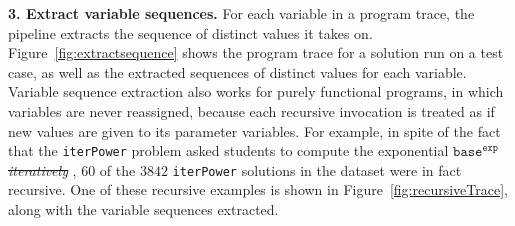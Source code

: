 \documentclass[12pt,twoside]{mitthesis}
\newcommand \codevar[1]{\texttt{#1}}
\providecommand{\DIFaddtex}[1]{{\protect\color{blue}\uwave{#1}}} %
\providecommand{\DIFdeltex}[1]{{\protect\color{red}\sout{#1}}}                      %
\providecommand{\DIFaddbegin}{} %
\providecommand{\DIFaddend}{} %
\providecommand{\DIFdelbegin}{} %
\providecommand{\DIFdelend}{} %
\providecommand{\DIFadd}[1]{\texorpdfstring{\DIFaddtex{#1}}{#1}} %
\providecommand{\DIFdel}[1]{\texorpdfstring{\DIFdeltex{#1}}{}} %
\begin{document}
{\bf 3. Extract variable sequences.} For each variable in a program trace, the pipeline extracts the sequence of distinct values it takes on. Figure~\ref{fig:extractsequence} shows the program trace for a solution run on a test case, as well as the extracted sequences of distinct values for each variable. Variable sequence extraction also works for purely functional programs, in which variables are never reassigned, because each recursive invocation is treated as if new values are given to its parameter variables. For example, in spite of the fact that the \codevar{iterPower} problem asked students to compute the exponential $\codevar{base}^\codevar{exp}$ \DIFdelbegin \textit{\DIFdel{iteratively}}%
\DIFdelend \DIFaddbegin \DIFadd{iteratively}\DIFaddend , $60$ of the $3842$ \codevar{iterPower} solutions in the dataset were in fact recursive. One of these recursive examples is shown in Figure~\ref{fig:recursiveTrace}, along with the variable sequences extracted.
\end{document}
